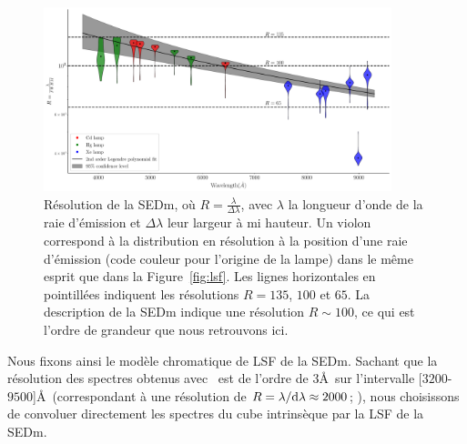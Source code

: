 \documentclass[../main/main.tex]{subfiles}
\begin{document}
\begin{figure}[h!]
  \centering
  \includegraphics[width=0.9\textwidth]{../figures/06_irf/SEDmResolution_wmodel.pdf}
  \caption[Résolution de la SEDm]{Résolution de la SEDm, où
    $R=\frac{\lambda}{\Delta\lambda}$, avec $\lambda$ la longueur d'onde
  de la raie d'émission et $\Delta\lambda$ leur largeur à mi
  hauteur. Un violon correspond à la distribution en résolution à la
  position d'une raie d'émission (code couleur pour l'origine de la
  lampe) dans le même esprit que dans la Figure~\ref{fig:lsf}. Les lignes horizontales en pointillées indiquent les
  résolutions $R=135$, $100$ et $65$. La description de la SEDm
  \citep{SEDM18} indique une résolution $R\sim100$, ce qui est l'ordre
  de grandeur que nous retrouvons ici.}
  \label{fig:resolutionsedm}
\end{figure}




Nous fixons ainsi le modèle chromatique de LSF de la SEDm. Sachant que la résolution
des spectres obtenus avec \cigale\ est de l'ordre de $3$\AA\ sur
l'intervalle [$3200$-$9500$]\AA\ (correspondant à une résolution de
$R=\lambda/\mathrm{d}\lambda\approx2000$; \citet{BCO3}), nous choisissons
de convoluer directement les spectres du cube intrinsèque par la LSF de
la SEDm.
\end{document}
